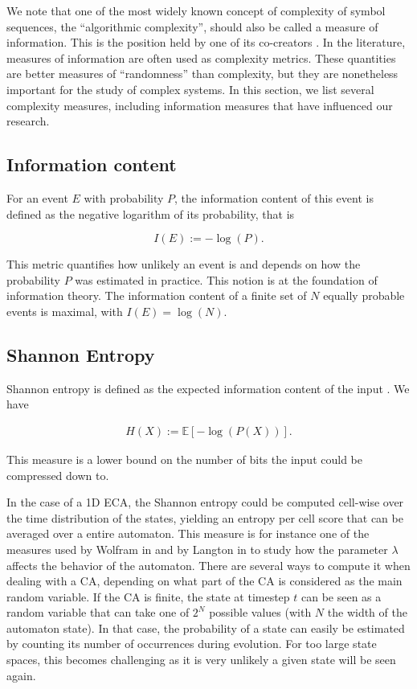 We note that one of the most widely known concept of complexity of symbol
sequences, the ``algorithmic complexity'', should also be called a measure of
information. This is the position held by one of its co-creators
\parencite{chaitinInformationRandomnessIncompleteness1990}. In the literature,
measures of information are often used as complexity metrics. These quantities
are better measures of ``randomness'' than complexity, but they are nonetheless
important for the study of complex systems. In this section, we list several
complexity measures, including information measures that have influenced our
research.

\subsection{Information content}
For an event $E$ with probability $P$, the information content of this event is
defined as the negative logarithm of its probability, that is

\begin{equation}
  I(E) :=  -\log(P).
\end{equation}

This metric quantifies how unlikely an event is and depends on how the
probability $P$ was estimated in practice. This notion is at the foundation of
information theory. The information content of a finite set of $N$ equally probable
events is maximal, with $I(E) = \log(N)$.

\subsection{Shannon Entropy}
Shannon entropy is defined as the expected information content of the input
\parencite{shannonMathematicalTheoryCommunication1975}. We have

\begin{align*}
  H(X) := \mathbb{E}[-\log(P(X))].
\end{align*}

This measure is a lower bound on the number of bits the input could be
compressed down to.

In the case of a 1D \ac{ECA}, the Shannon entropy could be computed cell-wise
over the time distribution of the states, yielding an entropy per cell score
that can be averaged over a entire automaton. This measure is for instance one
of the measures used by Wolfram in
\parencite{wolframStatisticalMechanicsCellular1983} and by Langton in
\parencite{langtonComputationEdgeChaos1990} to study how the parameter $\lambda$
affects the behavior of the automaton. There are several ways to compute it when
dealing with a CA, depending on what part of the CA is considered as the main
random variable. If the CA is finite, the state at timestep $t$ can be seen as a
random variable that can take one of $2^N$ possible values (with $N$ the width
of the automaton state). In that case, the probability of a state can easily be
estimated by counting its number of occurrences during evolution. For too large
state spaces, this becomes challenging as it is very unlikely a given state will
be seen again.

